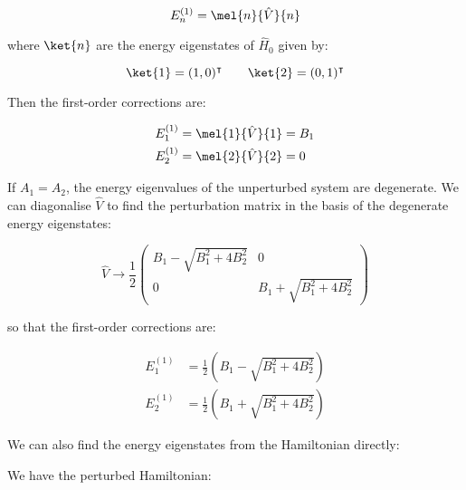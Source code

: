 \documentclass[12pt]{article}
\begin{document}
\begin{equation}
    E_{n}^{(1)} = \mel{n}{\hat{V}}{n}
\end{equation}

where $\ket{n}$ are the energy eigenstates of $\hat{H}_{0}$ given by:

\begin{equation}
    \ket{1} = (1, 0)^{\intercal} \qquad \ket{2} = (0, 1)^{\intercal}
\end{equation}

Then the first-order corrections are:

\begin{equation}
    \begin{split}
        E_{1}^{(1)} &= \mel{1}{\hat{V}}{1} = B_{1} \\
        E_{2}^{(1)} &= \mel{2}{\hat{V}}{2} = 0
    \end{split}
\end{equation}

If $A_{1} = A_{2}$, the energy eigenvalues of the unperturbed system are degenerate. We can diagonalise $\hat{V}$ to find the perturbation matrix in the basis of the degenerate energy eigenstates:

\begin{equation}
    \hat{V} \to
    \frac{1}{2}
    \begin{pmatrix}
        B_{1} - \sqrt{B_{1}^{2} + 4B_{2}^{2}} & 0                                     \\
        0                                     & B_{1} + \sqrt{B_{1}^{2} + 4B_{2}^{2}}
    \end{pmatrix}
\end{equation}

so that the first-order corrections are:

\begin{equation}
    \begin{split}
        E_{1}^{(1)} &= \frac{1}{2} \left( B_{1} - \sqrt{B_{1}^{2} + 4B_{2}^{2}} \right) \\
        E_{2}^{(1)} &= \frac{1}{2} \left( B_{1} + \sqrt{B_{1}^{2} + 4B_{2}^{2}} \right)
    \end{split}
\end{equation}

We can also find the energy eigenstates from the Hamiltonian directly:




We have the perturbed Hamiltonian:
\end{document}
